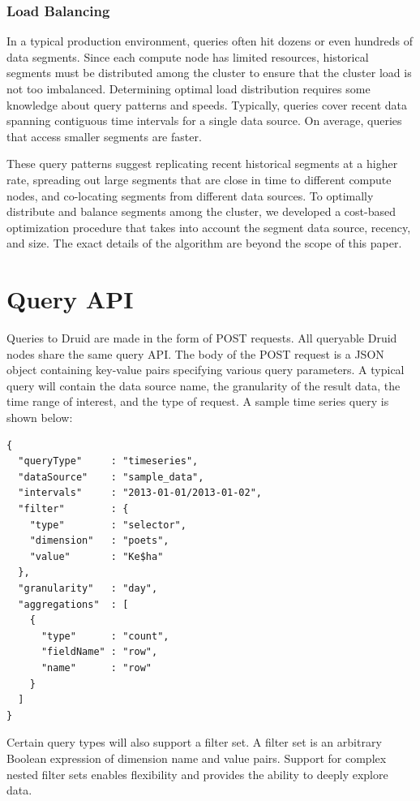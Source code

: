 \documentclass{vldb}
\begin{document}
\subsubsection{Load Balancing}
In a typical production environment, queries often hit dozens or even
hundreds of data segments. Since each compute node has limited
resources, historical segments must be distributed among the cluster
to ensure that the cluster load is not too imbalanced. Determining
optimal load distribution requires some knowledge about query patterns
and speeds. Typically, queries cover recent data spanning contiguous
time intervals for a single data source.  On average, queries that
access smaller segments are faster.

These query patterns suggest replicating recent historical segments at
a higher rate, spreading out large segments that are close in time to
different compute nodes, and co-locating segments from different data
sources.  To optimally distribute and balance segments among the
cluster, we developed a cost-based optimization procedure that takes
into account the segment data source, recency, and size. The exact
details of the algorithm are beyond the scope of this paper.

\section{Query API}
\label{sec:query-api}
Queries to Druid are made in the form of POST requests. All queryable
Druid nodes share the same query API. The body of the POST request is
a JSON object containing key-value pairs specifying various query
parameters. A typical query will contain the data source name, the
granularity of the result data, the time range of interest, and the
type of request.  A sample time series query is shown below:
\begin{verbatim}
{
  "queryType"     : "timeseries",
  "dataSource"    : "sample_data",
  "intervals"     : "2013-01-01/2013-01-02",
  "filter"        : {
    "type"        : "selector",
    "dimension"   : "poets",
    "value"       : "Ke$ha"
  },
  "granularity"   : "day",
  "aggregations"  : [
    {
      "type"      : "count",
      "fieldName" : "row",
      "name"      : "row"
    }
  ]
}
\end{verbatim}

Certain query types will also support a filter set. A filter set is an
arbitrary Boolean expression of dimension name and value
pairs. Support for complex nested filter sets enables flexibility and
provides the ability to deeply explore data.
\end{document}
